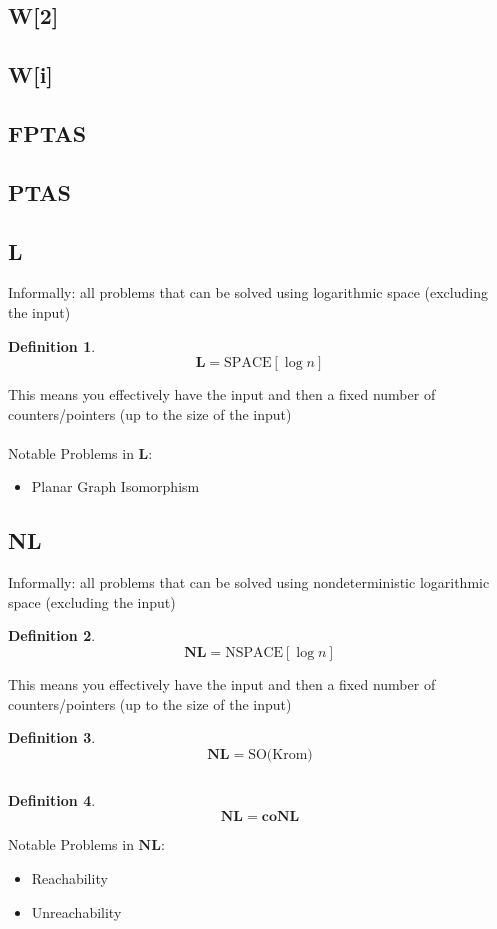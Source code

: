 \documentclass[]{article}
\theoremstyle{break}
\theoremstyle{break}
\newtheorem{definition}{Definition}[section]
\begin{document}
\subsection{W[2]}
\subsection{W[i]}
\label{sec:W}
\subsection{FPTAS}

\subsection{PTAS}

\subsection{L}
\label{sec:L}
Informally: all problems that can be solved using logarithmic space (excluding the input)
\\
\begin{definition}
	$$\mathbf{L} = \hyperref[sec:SPACE]{\text{SPACE}[\log n]}$$
\end{definition}
$ $
\\
This means you effectively have the input and then a fixed number of counters/pointers (up to the size of the input)
\\
\\
Notable Problems in $\mathbf{L}$:
\begin{itemize}
	\item Planar Graph Isomorphism
\end{itemize}
\subsection{NL}
\label{sec:NL}
Informally: all problems that can be solved using nondeterministic logarithmic space (excluding the input)
\\
\begin{definition}
	$$\mathbf{NL} = \hyperref[sec:NSPACE]{\text{NSPACE}[\log n]}$$
\end{definition}
$ $
\\
This means you effectively have the input and then a fixed number of counters/pointers (up to the size of the input)
\\
\begin{definition}
	$$\mathbf{NL} = \text{SO(Krom)}$$
\end{definition}
$ $
\\
\begin{definition}
	$$\mathbf{NL} = \mathbf{coNL}$$
\end{definition}
$ $
\\
Notable Problems in $\mathbf{NL}$:
\begin{itemize}
	\item Reachability
	\item Unreachability
\end{itemize}
\end{document}

